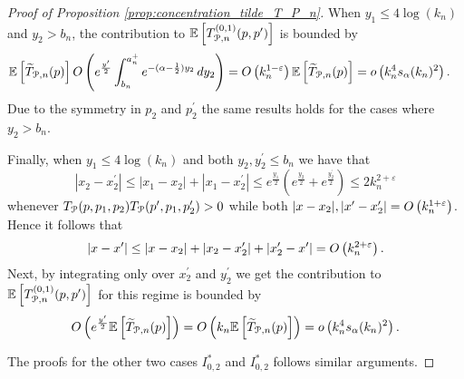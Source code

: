 \begin{proof}[Proof of Proposition \ref{prop:concentration_tilde_T_P_n}]
When $y_1 \le 4\log(k_n)$ and $y_2 > b_n$, the contribution to $\mathbb{E}\left[T^{(0,1)}_{{\mathcal P},n}(p,p^\prime)\right]$ is bounded by
\begin{align*}
	\mathbb{E}\left[\widetilde{T}_{{\mathcal P},n}(p)\right]
		O\left(e^{\frac{y^\prime}{2}}\int_{b_n}^{a_n^+} e^{-(\alpha -\frac{1}{2})y_2} \, dy_2\right)
	&= O\left(k_n^{1 - \varepsilon}\right)\mathbb{E}\left[\widetilde{T}_{{\mathcal P},n}(p)\right]
	= o\left(k_n^4 s_\alpha(k_n)^2\right).
\end{align*}
Due to the symmetry in $p_2$ and $p_2^\prime$ the same results holds for the cases where $y_2 > b_n$.

Finally, when $y_1 \le 4\log(k_n)$ and both $y_2, y_2^\prime \le b_n$ we have that
\[
	|x_2 - x_2^\prime| \le |x_1 - x_2| + |x_1 - x_2^\prime| \le e^{\frac{y_1}{2}}\left(e^{\frac{y_2}{2}} + e^{\frac{y_2^\prime}{2}}\right) \le 2k_n^{2+\varepsilon}
\]
whenever $T_{{\mathcal P}}(p,p_1,p_2) T_{{\mathcal P}}(p^\prime,p_1,p_2^\prime) > 0$ while both $|x - x_2|, |x^\prime - x_2^\prime| = O\left(k_n^{1 + \varepsilon}\right)$. Hence it follows that
\[
	|x - x^\prime| \le |x - x_2| + |x_2 - x_2^\prime| + |x_2^\prime - x^\prime| = O\left(k_n^{2 + \varepsilon}\right).
\]
Next, by integrating only over $x_2^\prime$ and $y_2^\prime $ we get the contribution to $\mathbb{E}\left[T^{(0,1)}_{{\mathcal P},n}(p,p^\prime)\right]$ for this regime is bounded by
\[
	O\left(e^{\frac{y^\prime}{2}} \mathbb{E}\left[\widetilde{T}_{{\mathcal P},n}(p)\right]\right)
	= O\left(k_n \mathbb{E}\left[\widetilde{T}_{{\mathcal P},n}(p)\right]\right) = o\left(k_n^4 s_\alpha(k_n)^2\right).
\]

The proofs for the other two cases $I_{0,2}^\ast$ and $I_{0,2}^\ast$ follows similar arguments.

%

\end{proof}


%
%
